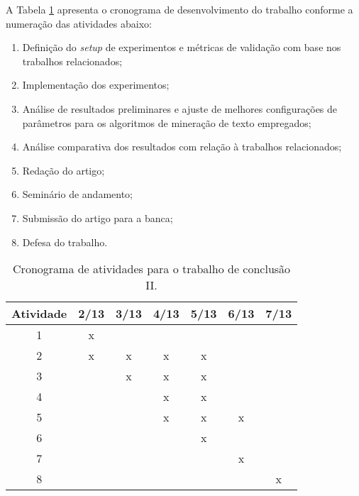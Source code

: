 \documentclass[11pt,a4paper]{article}
\begin{document}
A Tabela \ref{tab:cronograma2} apresenta o cronograma de desenvolvimento do trabalho conforme a numeração das atividades abaixo:
\begin{enumerate}
  \item Definição do \textit{setup} de experimentos e métricas de validação com base nos trabalhos relacionados;
  \item Implementação dos experimentos;
  \item Análise de resultados preliminares e ajuste de melhores configurações de parâmetros para os algoritmos de mineração de texto empregados;
  \item Análise comparativa dos resultados com relação à trabalhos relacionados;
  \item Redação do artigo;
  \item Seminário de andamento;
  \item Submissão do artigo para a banca;
  \item Defesa do trabalho.
\end{enumerate}

\begin{table}[h]
  \begin{center}
    \caption{Cronograma de atividades para o trabalho de conclusão II. \label{tab:cronograma2}}
    \begin{tabular}{|c|c|c|c|c|c|c|}
      \hline
      \bf Atividade & \bf 2/13 & \bf 3/13 & \bf 4/13 & \bf 5/13 & \bf 6/13 & \bf 7/13  \\  \hline \hline
      1 & x &   &   &   &   &   \\ \hline
      2 & x & x & x & x &   &   \\ \hline
      3 &   & x & x & x &   &   \\ \hline
      4 &   &   & x & x &   &   \\ \hline
      5 &   &   & x & x & x &   \\ \hline
      6 &   &   &   & x  &   &   \\ \hline
      7 &   &   &   &   & x &   \\ \hline
      8 &   &   &   &   &   & x \\ \hline
    \end{tabular}
  \end{center}
\end{table}

\renewcommand\refname{Referências}
{\small
  
  
}
\end{document}
